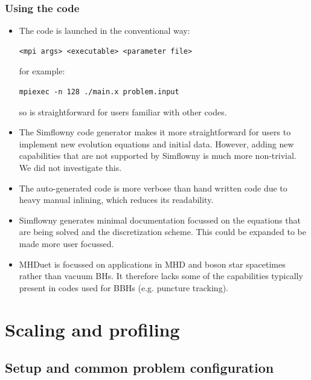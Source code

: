 \documentclass[12pt,a4paper]{article}
\numberwithin{figure}{subsection}
\begin{document}
\subsubsection{Using the code}
\begin{itemize}
    \item The code is launched in the conventional way:
    \begin{lstlisting}[style=shortcode]
        <mpi args> <executable> <parameter file>
    \end{lstlisting}
    for example:
    \begin{lstlisting}[style=shortcode]
        mpiexec -n 128 ./main.x problem.input
    \end{lstlisting}
    so is straightforward for users familiar with other codes.
    \item The Simflowny code generator makes it more
    straightforward for users to implement new evolution equations and initial data. However, adding new
    capabilities that are not supported by Simflowny is much more non-trivial.
    We did not investigate this.
    \item The auto-generated code is more verbose than hand written code due to heavy manual inlining,
    which reduces its readability.
    \item Simflowny generates minimal documentation focussed on
    the equations that are being solved and the discretization scheme. This could be expanded to be made
    more user focussed.
    \item MHDuet is focussed on applications in MHD and boson star spacetimes rather than
    vacuum BHs. It therefore lacks some of the capabilities typically
    present in codes used for BBHs (e.g. puncture tracking).
\end{itemize}

\section{Scaling and profiling}
\label{sec:performance}

\subsection{Setup and common problem configuration}
\end{document}
